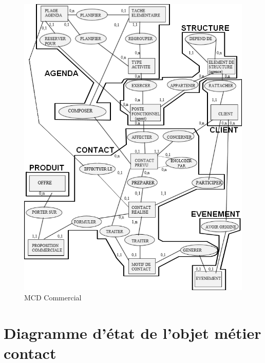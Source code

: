 \begin{figure}[H]
\centering
\includegraphics[width=\textwidth]{figures/mcd/MCD_Commercial}
\caption{MCD Commercial}
\end{figure}

\section{Diagramme d’état de l'objet métier \bf{contact}}

